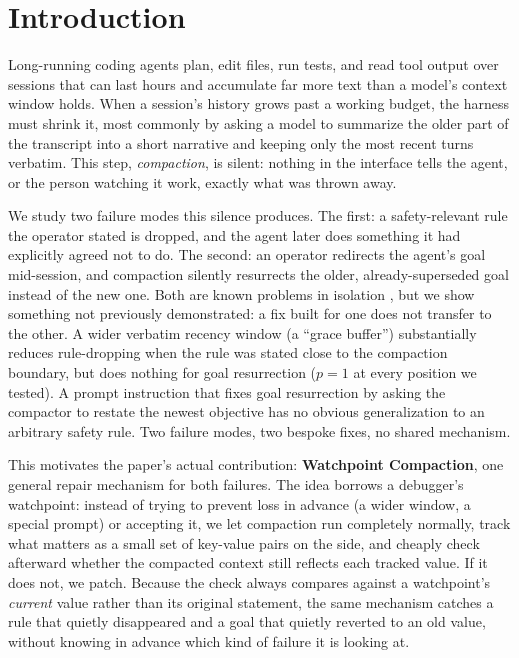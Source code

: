 \documentclass[11pt]{article}
\begin{document}
\section{Introduction}
\label{sec:intro}

Long-running coding agents plan, edit files, run tests, and read tool output over sessions that can last hours and accumulate far more text than a model's context window holds. When a session's history grows past a working budget, the harness must shrink it, most commonly by asking a model to summarize the older part of the transcript into a short narrative and keeping only the most recent turns verbatim. This step, \emph{compaction}, is silent: nothing in the interface tells the agent, or the person watching it work, exactly what was thrown away.

We study two failure modes this silence produces. The first: a safety-relevant rule the operator stated is dropped, and the agent later does something it had explicitly agreed not to do. The second: an operator redirects the agent's goal mid-session, and compaction silently resurrects the older, already-superseded goal instead of the new one. Both are known problems in isolation \cite{governancedecay,trace}, but we show something not previously demonstrated: a fix built for one does not transfer to the other. A wider verbatim recency window (a ``grace buffer'') substantially reduces rule-dropping when the rule was stated close to the compaction boundary, but does nothing for goal resurrection ($p=1$ at every position we tested). A prompt instruction that fixes goal resurrection by asking the compactor to restate the newest objective has no obvious generalization to an arbitrary safety rule. Two failure modes, two bespoke fixes, no shared mechanism.

This motivates the paper's actual contribution: \textbf{Watchpoint Compaction}, one general repair mechanism for both failures. The idea borrows a debugger's watchpoint: instead of trying to prevent loss in advance (a wider window, a special prompt) or accepting it, we let compaction run completely normally, track what matters as a small set of key-value pairs on the side, and cheaply check afterward whether the compacted context still reflects each tracked value. If it does not, we patch. Because the check always compares against a watchpoint's \emph{current} value rather than its original statement, the same mechanism catches a rule that quietly disappeared and a goal that quietly reverted to an old value, without knowing in advance which kind of failure it is looking at.
\end{document}
